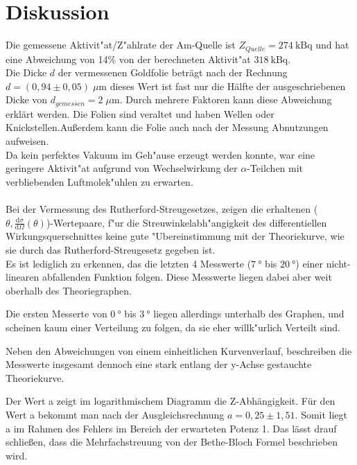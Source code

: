 \section{Diskussion}
\label{sec:Diskussion}
  Die gemessene Aktivit"at/Z"ahlrate der Am-Quelle ist $Z_{Quelle}=\SI{274}{\kilo \becquerel}$ und hat eine Abweichung von 14\% von der berechneten Aktivit"at $\SI{318}{\kilo \becquerel}$. \\
  
  Die Dicke $d$ der vermessenen Goldfolie beträgt nach der Rechnung $d=(0,94 \pm 0,05)\; \mu \text{m}$ dieses Wert ist fast nur die Hälfte der ausgeschriebenen Dicke von $d_{gemessen}=2\; \mu \text{m}$. Durch mehrere Faktoren kann diese Abweichung erklärt werden. Die Folien sind veraltet und haben Wellen oder Knickstellen.Außerdem kann die Folie auch nach der Messung Abnutzungen aufweisen. \\
  
  Da kein perfektes Vakuum im Geh"ause erzeugt werden konnte, war eine geringere Aktivit"at aufgrund von Wechselwirkung der $\alpha$-Teilchen mit verbliebenden Luftmolek"uhlen zu erwarten.\\
  \\Bei der Vermessung des Rutherford-Streugesetzes, zeigen die erhaltenen ($\theta,\frac{\text{d}\sigma}{\text{d}\Omega}(\theta)$)-Wertepaare, f"ur die Streuwinkelabh"angigkeit des differentiellen Wirkungsquerschnittes keine gute "Ubereinstimmung mit der Theoriekurve, wie sie durch das Rutherford-Streugesetz gegeben ist. \\

  Es ist lediglich zu erkennen, das die letzten 4 Messwerte ($\SI{7}{\degree}$ bis $\SI{20}{\degree}$) einer nicht-linearen abfallenden Funktion folgen.
  Diese Messwerte liegen dabei aber weit oberhalb des Theoriegraphen.

  Die ersten Messerte von $\SI{0}{\degree}$ bis $\SI{3}{\degree}$ liegen allerdings unterhalb des Graphen, und scheinen kaum einer Verteilung zu folgen, da sie eher willk"urlich Verteilt sind.

  Neben den Abweichungen von einem einheitlichen Kurvenverlauf, beschreiben die Messwerte insgesamt dennoch eine stark entlang der y-Achse gestauchte Theoriekurve.
  
 Der Wert a zeigt im logarithmischem Diagramm die Z-Abhängigkeit. Für den Wert a bekommt man nach der Ausgleichsrechnung $a=0,25 \pm 1,51$. Somit liegt a im Rahmen des Fehlers im Bereich der erwarteten Potenz 1. Das lässt drauf schließen, dass die Mehrfachstreuung von der Bethe-Bloch Formel beschrieben wird.
